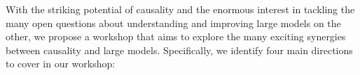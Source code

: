 \documentclass{article}
\newcommand{\todo}[1]{\textcolor{red}{~TODO: #1}}
\begin{document}



With the striking potential of causality and the enormous interest in tackling the many open questions about understanding and improving large models on the other, we propose a workshop that aims to explore the many exciting synergies between causality and large models.
Specifically, we identify four main directions to cover in our workshop: 

\end{document}
